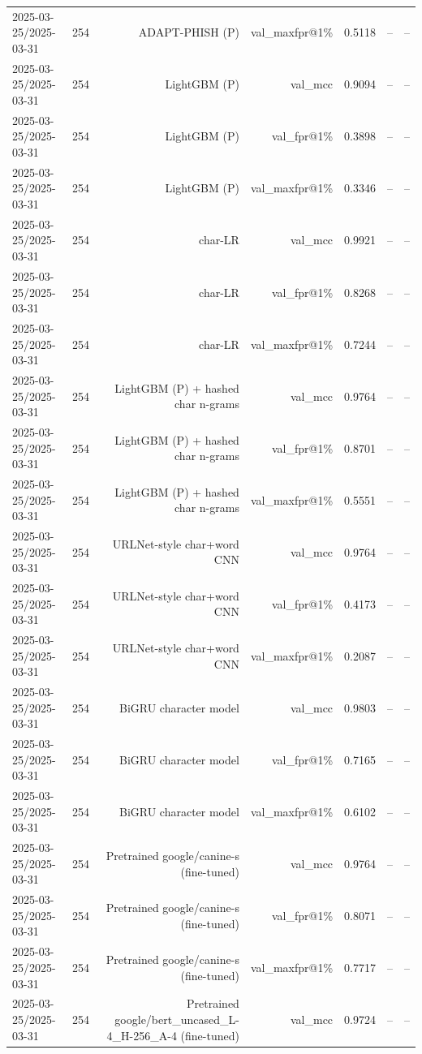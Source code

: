 \begin{table}[t]
\begin{tabular}{llrrrrr}
2025-03-25/2025-03-31 & 254 & ADAPT-PHISH (P) & val\_maxfpr@1\% & 0.5118 & -- & -- \\
2025-03-25/2025-03-31 & 254 & LightGBM (P) & val\_mcc & 0.9094 & -- & -- \\
2025-03-25/2025-03-31 & 254 & LightGBM (P) & val\_fpr@1\% & 0.3898 & -- & -- \\
2025-03-25/2025-03-31 & 254 & LightGBM (P) & val\_maxfpr@1\% & 0.3346 & -- & -- \\
2025-03-25/2025-03-31 & 254 & char-LR & val\_mcc & 0.9921 & -- & -- \\
2025-03-25/2025-03-31 & 254 & char-LR & val\_fpr@1\% & 0.8268 & -- & -- \\
2025-03-25/2025-03-31 & 254 & char-LR & val\_maxfpr@1\% & 0.7244 & -- & -- \\
2025-03-25/2025-03-31 & 254 & LightGBM (P) + hashed char n-grams & val\_mcc & 0.9764 & -- & -- \\
2025-03-25/2025-03-31 & 254 & LightGBM (P) + hashed char n-grams & val\_fpr@1\% & 0.8701 & -- & -- \\
2025-03-25/2025-03-31 & 254 & LightGBM (P) + hashed char n-grams & val\_maxfpr@1\% & 0.5551 & -- & -- \\
2025-03-25/2025-03-31 & 254 & URLNet-style char+word CNN & val\_mcc & 0.9764 & -- & -- \\
2025-03-25/2025-03-31 & 254 & URLNet-style char+word CNN & val\_fpr@1\% & 0.4173 & -- & -- \\
2025-03-25/2025-03-31 & 254 & URLNet-style char+word CNN & val\_maxfpr@1\% & 0.2087 & -- & -- \\
2025-03-25/2025-03-31 & 254 & BiGRU character model & val\_mcc & 0.9803 & -- & -- \\
2025-03-25/2025-03-31 & 254 & BiGRU character model & val\_fpr@1\% & 0.7165 & -- & -- \\
2025-03-25/2025-03-31 & 254 & BiGRU character model & val\_maxfpr@1\% & 0.6102 & -- & -- \\
2025-03-25/2025-03-31 & 254 & Pretrained google/canine-s (fine-tuned) & val\_mcc & 0.9764 & -- & -- \\
2025-03-25/2025-03-31 & 254 & Pretrained google/canine-s (fine-tuned) & val\_fpr@1\% & 0.8071 & -- & -- \\
2025-03-25/2025-03-31 & 254 & Pretrained google/canine-s (fine-tuned) & val\_maxfpr@1\% & 0.7717 & -- & -- \\
2025-03-25/2025-03-31 & 254 & Pretrained google/bert\_uncased\_L-4\_H-256\_A-4 (fine-tuned) & val\_mcc & 0.9724 & -- & -- \\

\end{tabular}
\end{table}
